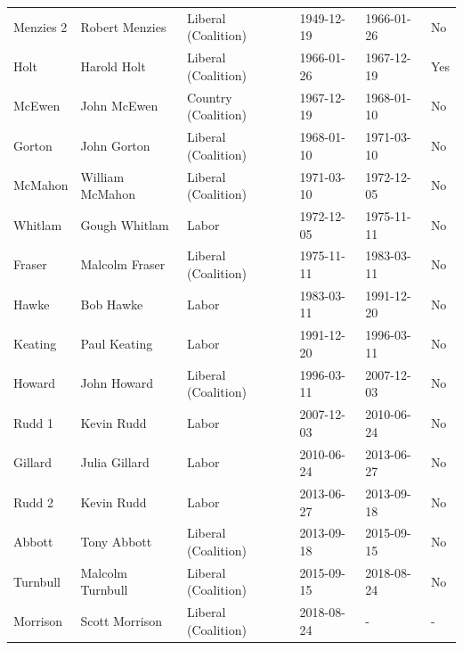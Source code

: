 \documentclass[12pt,]{article}
\theoremstyle{definition}
\theoremstyle{definition}
\theoremstyle{definition}
\theoremstyle{remark}
\begin{document}
\begin{table}
\begin{tabular}[t]{llllll}
\addlinespace
Menzies 2 & Robert Menzies & Liberal (Coalition) & 1949-12-19 & 1966-01-26 & No\\
Holt & Harold Holt & Liberal (Coalition) & 1966-01-26 & 1967-12-19 & Yes\\
McEwen & John McEwen & Country (Coalition) & 1967-12-19 & 1968-01-10 & No\\
Gorton & John Gorton & Liberal (Coalition) & 1968-01-10 & 1971-03-10 & No\\
McMahon & William McMahon & Liberal (Coalition) & 1971-03-10 & 1972-12-05 & No\\
\addlinespace
Whitlam & Gough Whitlam & Labor & 1972-12-05 & 1975-11-11 & No\\
Fraser & Malcolm Fraser & Liberal (Coalition) & 1975-11-11 & 1983-03-11 & No\\
Hawke & Bob Hawke & Labor & 1983-03-11 & 1991-12-20 & No\\
Keating & Paul Keating & Labor & 1991-12-20 & 1996-03-11 & No\\
Howard & John Howard & Liberal (Coalition) & 1996-03-11 & 2007-12-03 & No\\
\addlinespace
Rudd 1 & Kevin Rudd & Labor & 2007-12-03 & 2010-06-24 & No\\
Gillard & Julia Gillard & Labor & 2010-06-24 & 2013-06-27 & No\\
Rudd 2 & Kevin Rudd & Labor & 2013-06-27 & 2013-09-18 & No\\
Abbott & Tony Abbott & Liberal (Coalition) & 2013-09-18 & 2015-09-15 & No\\
Turnbull & Malcolm Turnbull & Liberal (Coalition) & 2015-09-15 & 2018-08-24 & No\\
Morrison & Scott Morrison & Liberal (Coalition) & 2018-08-24 & - & -\\
\bottomrule
\end{tabular}
\end{table}
\end{document}
